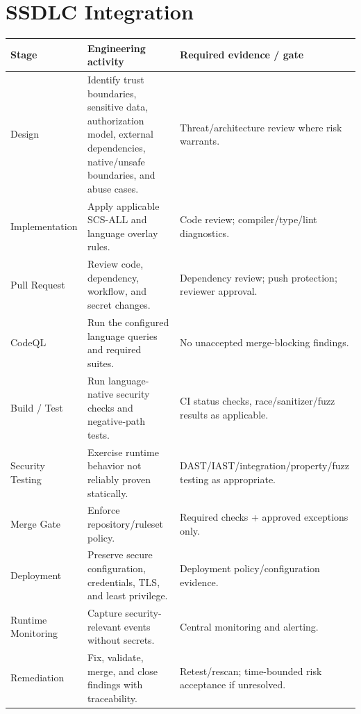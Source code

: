 \documentclass[10pt,letterpaper]{article}
\begin{document}
\section{SSDLC Integration}
\small
\begin{tabularx}{\textwidth}{@{}P{1.12in}Y P{2.15in}@{}}
\toprule
\textbf{Stage} & \textbf{Engineering activity} & \textbf{Required evidence / gate}\\
\midrule
Design & Identify trust boundaries, sensitive data, authorization model, external dependencies, native/unsafe boundaries, and abuse cases. & Threat/architecture review where risk warrants.\\
Implementation & Apply applicable SCS-ALL and language overlay rules. & Code review; compiler/type/lint diagnostics.\\
Pull Request & Review code, dependency, workflow, and secret changes. & Dependency review; push protection; reviewer approval.\\
CodeQL & Run the configured language queries and required suites. & No unaccepted merge-blocking findings.\\
Build / Test & Run language-native security checks and negative-path tests. & CI status checks, race/sanitizer/fuzz results as applicable.\\
Security Testing & Exercise runtime behavior not reliably proven statically. & DAST/IAST/integration/property/fuzz testing as appropriate.\\
Merge Gate & Enforce repository/ruleset policy. & Required checks + approved exceptions only.\\
Deployment & Preserve secure configuration, credentials, TLS, and least privilege. & Deployment policy/configuration evidence.\\
Runtime Monitoring & Capture security-relevant events without secrets. & Central monitoring and alerting.\\
Remediation & Fix, validate, merge, and close findings with traceability. & Retest/rescan; time-bounded risk acceptance if unresolved.\\
\bottomrule
\end{tabularx}
\normalsize
\end{document}
